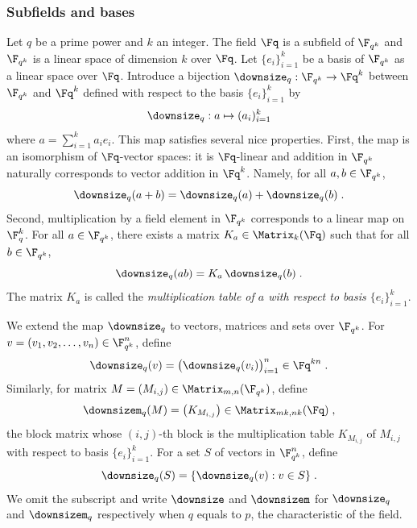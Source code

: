 \subsubsection{Subfields and bases}
\label{sec:subfields}
Let $q$ be a prime power and $k$ an integer. 
The field $\Fq$ is a subfield of $\F_{q^k}$ and $\F_{q^k}$ is a linear space of
dimension $k$ over $\Fq$.
Let $\{ e_i \}_{i=1}^k$ be a basis of $\F_{q^k}$ as a linear space over $\Fq$.
Introduce a bijection $\downsize_q : \F_{q^k} \rightarrow \Fq^k$ between
$\F_{q^k}$ and $\Fq^k$ defined with respect to the basis $\{ e_i \}_{i=1}^k$ by
\begin{equation*}
  \downsize_q : a \mapsto (a_i)_{i=1}^k
\end{equation*}
where $a = \sum_{i=1}^k a_i e_i$.
This map satisfies several nice properties.
First, the map is an isomorphism of $\Fq$-vector spaces: it is $\Fq$-linear and addition in $\F_{q^k}$
naturally corresponds to vector addition in $\Fq^k$.
Namely, for all $a,b \in \F_{q^k}$,
\begin{equation*}
	\downsize_q (a + b) = \downsize_q(a) + \downsize_q(b)\;.
\end{equation*}
Second, multiplication by a field element in $\F_{q^k}$ corresponds to a linear
map on $\F_{q}^k$.
For all $a \in \F_{q^k}$, there exists a matrix $K_a \in \Matrix_k (\Fq)$ such
that for all $b \in \F_{q^k}$,
\begin{equation*}
	\downsize_q (a b) = K_a \, \downsize_q(b)\;.
\end{equation*}
The matrix $K_a$ is called the \emph{multiplication table of $a$ with respect to
  basis $\{e_i\}_{i=1}^k$}.

We extend the map $\downsize_q$ to vectors, matrices and sets over $\F_{q^k}$.
For $v = (v_1, v_2, \ldots, v_n) \in \F_{q^k}^n$, define
\begin{equation*}
  \downsize_q (v) = \bigl( \downsize_q (v_i) \bigr)_{i=1}^n \in \Fq^{kn}\;.
\end{equation*}
Similarly, for matrix $M = (M_{i, j}) \in \Matrix_{m, n}(\F_{q^k})$, define
\begin{equation*}
  \downsizem_q (M) = \bigl( K_{M_{i, j}} \bigr) \in \Matrix_{mk, nk} (\Fq)\;,
\end{equation*}
the block matrix whose $(i,j)$-th block is the multiplication table $K_{M_{i,
    j}}$ of $M_{i, j}$ with respect to basis $\{e_i\}_{i=1}^k$.
For a set $S$ of vectors in $\F_{q^k}^n$, define
\begin{equation*}
	\downsize_q(S) = \{ \downsize_q(v) : v \in S \}\;.
\end{equation*}
We omit the subscript and write $\downsize$ and $\downsizem$ for $\downsize_q$
and $\downsizem_q$ respectively when $q$ equals to $p$, the characteristic of
the field.

